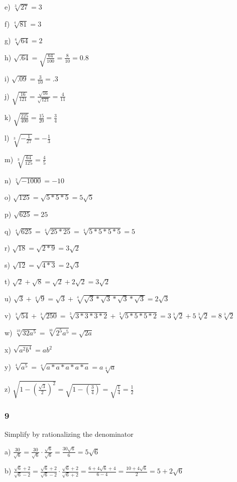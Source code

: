 \documentclass[]{report}
\begin{document}
e) $\sqrt[3]{27} = 3$

f) $\sqrt[4]{81} = 3$

g) $\sqrt[6]{64} = 2$

h) $\sqrt{.64} = \sqrt{\frac{64}{100}} = \frac{8}{10} = 0.8$

i) $\sqrt{.09} = \frac{3}{10} = .3$

j) $\sqrt{\frac{16}{121}} = \frac{\sqrt{16}}{\sqrt{121}} = \frac{4}{11}$

k) $\sqrt{\frac{225}{400}} = \frac{15}{20} = \frac{3}{4}$

l) $\sqrt[3]{-\frac{1}{27}} = -\frac{1}{3}$

m) $\sqrt[3]{\frac{64}{125}} = \frac{4}{5}$

n) $\sqrt[3]{-1000} = -10$ 

o) $\sqrt{125} = \sqrt{5 * 5 * 5} = 5\sqrt{5}$

p) $\sqrt{625} = 25$

q) $\sqrt[4]{625} = \sqrt[4]{25 * 25} = \sqrt[4]{5 * 5 * 5 * 5} = 5$

r) $\sqrt{18} = \sqrt{2 * 9} = 3\sqrt{2}$

s) $\sqrt{12} = \sqrt{4 * 3} = 2\sqrt{3}$

t) $\sqrt{2} + \sqrt{8} = \sqrt{2} + 2\sqrt{2} = 3\sqrt{2}$

u) $\sqrt{3} + \sqrt[4]{9} =  \sqrt{3} + \sqrt[4]{\sqrt{3} * \sqrt{3} * \sqrt{3} * \sqrt{3}} = 2\sqrt{3} $

v) $\sqrt[3]{54} + \sqrt[3]{250} = \sqrt[3]{3 * 3 * 3 * 2 } + \sqrt[3]{5 * 5 * 5 *2} = 3\sqrt[3]{2} + 5\sqrt[3]{2}  = 8\sqrt[3]2$

w) $\sqrt[10]{32a^5} = \sqrt[10]{2^5a^5} = \sqrt{2a}$

x) $\sqrt{a^2b^4} = ab^2$

y) $\sqrt[4]{a^5} = \sqrt[4]{a * a * a * a * a} = a \sqrt[4]{a}$

z) $\sqrt{1 - (\frac{\sqrt{3}}{2})^2} = \sqrt{1 - (\frac{3}{4})} = \sqrt{\frac{1}{4}}  = \frac{1}{2}$

\subsubsection{9}
Simplify by rationalizing the denominator


a) $\frac{30}{\sqrt{6}} = \frac{30}{\sqrt{6}} \cdot \frac{\sqrt{6}}{\sqrt{6}} = \frac{30\sqrt{6}}{6} = 5\sqrt{6}$

b) $\frac{\sqrt{6} + 2}{\sqrt{6} - 2} = \frac{\sqrt{6} + 2}{\sqrt{6} - 2} \cdot \frac{\sqrt{6} + 2}{\sqrt{6} + 2} = \frac{6 + 4\sqrt{6} + 4}{6 - 4} = \frac{10 + 4\sqrt{6}}{2} = 5 + 2\sqrt{6}$
\end{document}
